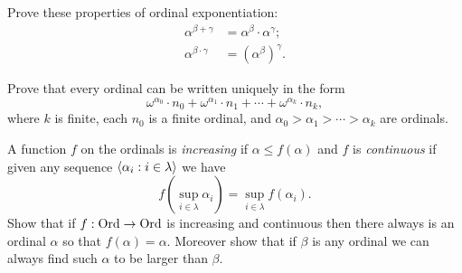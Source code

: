 \documentclass[10pt]{amsart}
\begin{document}
\begin{problem}
Prove these properties of ordinal exponentiation:
\begin{align*}
\alpha^{\beta + \gamma} &= \alpha^\beta \cdot \alpha^\gamma; \\
\alpha^{\beta \cdot \gamma} &= \left(\alpha^\beta\right)^\gamma.
\end{align*}
\end{problem}

\begin{problem}
Prove that every ordinal can be written uniquely in the form
\[
\omega^{\alpha_0} \cdot n_0 + \omega^{\alpha_1} \cdot n_1 + \cdots + \omega^{\alpha_k} \cdot n_k,
\]
where $k$ is finite, each $n_0$ is a finite ordinal, and $\alpha_0 > \alpha_1 > \cdots > \alpha_k$ are ordinals. 
\end{problem}


\begin{problem}
A function $f$ on the ordinals is \emph{increasing} if $\alpha \le f(\alpha)$ and $f$ is \emph{continuous} if given any sequence ${\left\langle \alpha_i : i \in \lambda \right\rangle}$ we have
\[
f\left(\sup_{i \in \lambda} \alpha_i\right) = \sup_{i \in \lambda} f(\alpha_i).
\]
Show that if $f : \mathrm{Ord} \to \mathrm{Ord}$ is increasing and continuous then there always is an ordinal $\alpha$ so that $f(\alpha) = \alpha$. Moreover show that if $\beta$ is any ordinal we can always find such $\alpha$ to be larger than $\beta$.
\end{problem}
\end{document}
